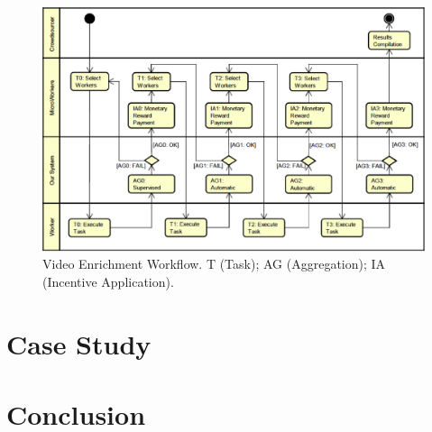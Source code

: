 \documentclass[sigconf]{acmart}
\begin{document}
%	
\begin{figure}[ht]
	\centerline{\includegraphics[scale=0.44] {figure/case}}
	\caption{Video Enrichment Workflow. T (Task); AG (Aggregation); IA (Incentive Application).}
	\label{workflow}
\end{figure}


\section{Case Study}
	

\pagebreak


\section{Conclusion}
	

\begin{acks}
	
\end{acks}


 
\end{document}
